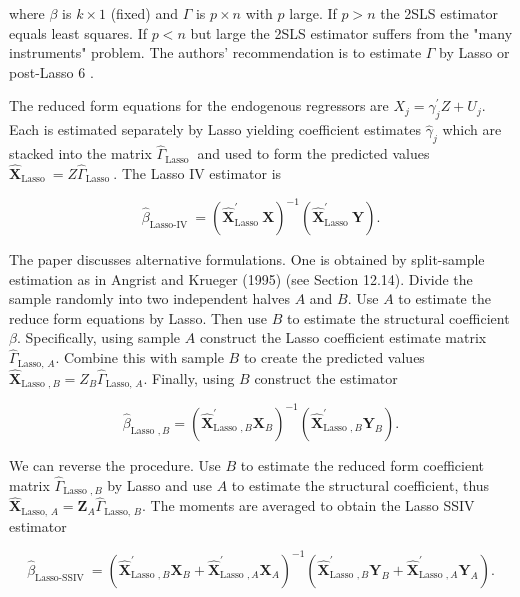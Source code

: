 \documentclass[10pt]{article}
\begin{document}
where $\beta$ is $k \times 1$ (fixed) and $\Gamma$ is $p \times n$ with $p$ large. If $p>n$ the 2SLS estimator equals least squares. If $p<n$ but large the 2SLS estimator suffers from the "many instruments" problem. The authors' recommendation is to estimate $\Gamma$ by Lasso or post-Lasso 6 .

The reduced form equations for the endogenous regressors are $X_{j}=\gamma_{j}^{\prime} Z+U_{j}$. Each is estimated separately by Lasso yielding coefficient estimates $\widehat{\gamma}_{j}$ which are stacked into the matrix $\widehat{\Gamma}_{\text {Lasso }}$ and used to form the predicted values $\widehat{\boldsymbol{X}}_{\text {Lasso }}=Z \widehat{\Gamma}_{\text {Lasso }}$. The Lasso IV estimator is

$$
\widehat{\beta}_{\text {Lasso-IV }}=\left(\widehat{\boldsymbol{X}}_{\text {Lasso }}^{\prime} \boldsymbol{X}\right)^{-1}\left(\widehat{\boldsymbol{X}}_{\text {Lasso }}^{\prime} \boldsymbol{Y}\right) .
$$

The paper discusses alternative formulations. One is obtained by split-sample estimation as in Angrist and Krueger (1995) (see Section 12.14). Divide the sample randomly into two independent halves $A$ and $B$. Use $A$ to estimate the reduce form equations by Lasso. Then use $B$ to estimate the structural coefficient $\beta$. Specifically, using sample $A$ construct the Lasso coefficient estimate matrix $\widehat{\Gamma}_{\text {Lasso, } A}$. Combine this with sample $B$ to create the predicted values $\widehat{\boldsymbol{X}}_{\text {Lasso }, B}=Z_{B} \widehat{\Gamma}_{\text {Lasso, } A}$. Finally, using $B$ construct the estimator

$$
\widehat{\beta}_{\text {Lasso }, B}=\left(\widehat{\boldsymbol{X}}_{\text {Lasso }, B}^{\prime} \boldsymbol{X}_{B}\right)^{-1}\left(\widehat{\boldsymbol{X}}_{\text {Lasso }, B}^{\prime} \boldsymbol{Y}_{B}\right) .
$$

We can reverse the procedure. Use $B$ to estimate the reduced form coefficient matrix $\widehat{\Gamma}_{\text {Lasso }, B}$ by Lasso and use $A$ to estimate the structural coefficient, thus $\widehat{\boldsymbol{X}}_{\text {Lasso, } A}=\boldsymbol{Z}_{A} \widehat{\Gamma}_{\text {Lasso, } B}$. The moments are averaged to obtain the Lasso SSIV estimator

$$
\widehat{\beta}_{\text {Lasso-SSIV }}=\left(\widehat{\boldsymbol{X}}_{\text {Lasso }, B}^{\prime} \boldsymbol{X}_{B}+\widehat{\boldsymbol{X}}_{\text {Lasso }, A}^{\prime} \boldsymbol{X}_{A}\right)^{-1}\left(\widehat{\boldsymbol{X}}_{\text {Lasso }, B}^{\prime} \boldsymbol{Y}_{B}+\widehat{\boldsymbol{X}}_{\text {Lasso }, A}^{\prime} \boldsymbol{Y}_{A}\right) .
$$
\end{document}
